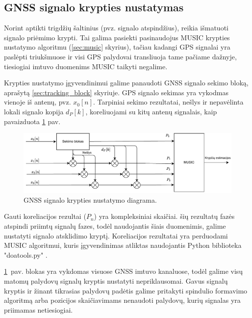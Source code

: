 \documentclass[main.tex]{subfiles}
\begin{document}
\subsection{GNSS signalo krypties nustatymas}\label{sec:gnss_doa_block}

Norint aptikti trigdžių šaltinius (pvz. signalo atspindžius), reikia išmatuoti
signalo priėmimo krypti. Tai galima pasiekti pasinaudojus MUSIC krypties nustatymo
algoritmu (\ref{sec:music} skyrius), tačiau kadangi GPS signalai yra paslėpti triukšmuose
ir visi GPS palydovai transliuoja tame pačiame dažnyje,
tiesiogiai imtuvo duomenims MUSIC taikyti negalime.

Krypties nustatymo įgyvendinimui galime panaudoti GNSS signalo sekimo bloką,
aprašytą \ref{sec:tracking_block} skyriuje. GPS signalo sekimas yra vykodmas
vienoje iš antenų, pvz. $x_0[n]$. Tarpiniai sekimo rezultatai, nešlys ir
nepavėlinta lokali signalo kopija $d_P[k]$, koreliuojami su
kitų antenų signalais, kaip pavaizduota \ref{fig:gnss_sdr_tracking_block_doa}
pav.

\begin{figure}[h]
    \begin{centering}
    \includegraphics[scale=0.85]{drawings/tracking_diagram_doa}
    \par\end{centering}
    \protect\caption{\label{fig:gnss_sdr_tracking_block_doa}GNSS signalo krypties nustatymo diagrama.}
\end{figure}

Gauti koreliacijos rezultai ($P_n$) yra kompleksiniai skaičiai. šių
rezultatų fazės atspindi priimtų signalų fazes, todėl naudojantis
šiais duomenimis, galime nustatyti signalo atsklidimo kryptį.
Koreliacijos rezultatai yra perduodami MUSIC algoritmui, kuris
įgyvendinimas atliktas naudojantis Python biblioteka "doatools.py" \cite{7738579}.

\ref{fig:gnss_sdr_tracking_block_doa}~pav. blokas yra vykdomas visuose
GNSS imtuvo kanaluose, todėl galime visų matomų palydovų signalų kryptis
nustatyti nepriklausomai. Gavus signalų kryptis ir žinant tikrasias
palydovų padėtis galime pritakyti spindulio formavimo algoritmą
arba pozicijos skaičiavimams nenaudoti palydovų, kurių signalas
yra priimamas netiesiogiai.
\end{document}
